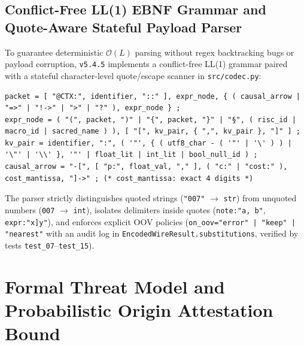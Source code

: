 \documentclass[9pt,a4paper]{extarticle}
\begin{document}
\subsection{Conflict-Free LL(1) EBNF Grammar and Quote-Aware Stateful Payload Parser}
To guarantee deterministic $\mathcal{O}(L)$ parsing without regex backtracking bugs or payload corruption, \texttt{v5.4.5} implements a conflict-free LL(1) grammar paired with a stateful character-level quote/escape scanner in \texttt{src/codec.py}:
\begin{lstlisting}
packet = [ "@CTX:", identifier, "::" ], expr_node, { ( causal_arrow | "=>" | "!->" | ">" | "?" ), expr_node } ;
expr_node = ( "(", packet, ")" | "{", packet, "}" | "§", ( risc_id | macro_id | sacred_name ) ), [ "[", kv_pair, { ",", kv_pair }, "]" ] ;
kv_pair = identifier, ":", ( '"', { ( utf8_char - ( '"' | '\' ) ) | '\"' | '\\' }, '"' | float_lit | int_lit | bool_null_id ) ;
causal_arrow = "-[", [ "p:", float_val, "," ], ( "c:" | "cost:" ), cost_mantissa, "]->" ; (* cost_mantissa: exact 4 digits *)
\end{lstlisting}
The parser strictly distinguishes quoted strings (\texttt{"007"} $\rightarrow$ \texttt{str}) from unquoted numbers (\texttt{007} $\rightarrow$ \texttt{int}), isolates delimiters inside quotes (\texttt{note:"a, b"}, \texttt{expr:"x]y"}), and enforces explicit OOV policies (\texttt{on\_oov="error" | "keep" | "nearest"} with an audit log in \texttt{EncodedWireResult.substitutions}, verified by tests \texttt{test\_07}--\texttt{test\_15}).

\section{Formal Threat Model and Probabilistic Origin Attestation Bound}
\end{document}
